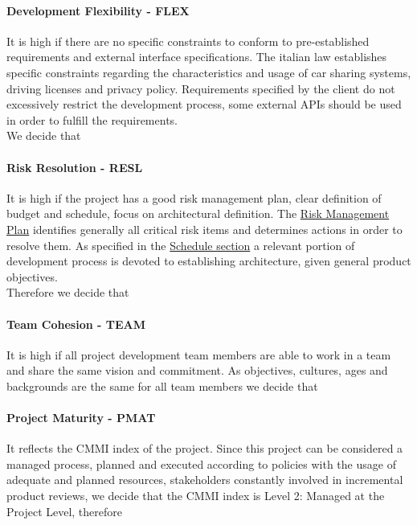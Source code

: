 \paragraph{Development Flexibility - FLEX} It is high if there are no specific constraints to conform to pre-established requirements and external interface specifications. The italian law establishes specific constraints regarding the characteristics and usage of car sharing systems, driving licenses and privacy policy. Requirements specified by the client do not excessively restrict the development process, some external APIs should be used in order to fulfill the requirements.\\We decide that

\paragraph{Risk Resolution - RESL} It is high if the project has a good risk management plan, clear definition of budget and schedule, focus on architectural definition. The \hyperref[sec:riskManagement]{Risk Management Plan} identifies generally all critical risk items and determines actions in order to resolve them. As specified in the \hyperref[sec:schedule]{Schedule section} a relevant portion of development process is devoted to establishing architecture, given general product objectives.\\Therefore we decide that

\paragraph{Team Cohesion - TEAM} It is high if all project development team members are able to work in a team and share the same vision and commitment. As objectives, cultures, ages and backgrounds are the same for all team members we decide that

\paragraph{Project Maturity - PMAT} It reflects the CMMI index of the project. Since this project can be considered a managed process, planned and executed according to policies with the usage of adequate and planned resources, stakeholders constantly involved in incremental product reviews, we decide that the CMMI index is Level 2: Managed at the Project Level, therefore

